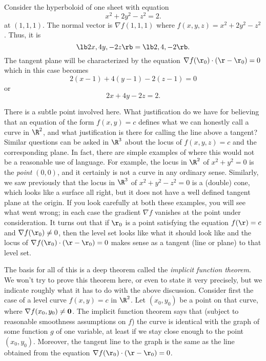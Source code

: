 \nextex
{}
Consider the hyperboloid of one sheet with equation
$$
  x^2 + 2y^2 - z^2 = 2.
$$
at $(1, 1, 1)$.  The normal vector is $\nabla f(1, 1, 1)$
where $f(x,y,z) = x^2 + 2y^2 - z^2$.  Thus, it is
$$
\lb 2x, 4y, -2z \rb = \lb 2, 4, -2 \rb.
$$
The tangent plane will be characterized by the equation
$\nabla f(\r_0)\cdot(\r - \r_0) = 0$ which in this case
becomes
$$
   2(x - 1) + 4(y - 1) - 2(z - 1) = 0
$$
or
$$
  2x + 4y - 2z = 2.
$$

\endexample

There is a subtle point involved here.  What justification do we
have for believing that an equation of the form
$f(x,y) = c$ defines what we can honestly call a curve
in $\R^2$, and what justification is there for calling the
line above a tangent?  Similar questions can be
asked in $\R^3$ about the
 locus of $f(x,y,z) = c$ and the corresponding plane.
In fact, there are simple examples of where this would not
be a reasonable use of language.  For example, the locus in $\R^2$
of $x^2 + y^2 = 0$ is the {\it point\/} $(0,0)$, and it
certainly is not a curve in any ordinary sense.  Similarly,
 we saw previously that the locus in
$\R^3$ of $x^2 + y^2 - z^2 = 0$ is a (double)
cone, which looks like a surface all right, but it does not have
a well defined tangent plane at the origin.
If you look carefully at both these examples, you will see what
went wrong; in each case the gradient $\nabla f$ vanishes at
the point under consideration.  It turns out that if $\r_0$
is a point satisfying the equation $f(\r) = c$ and $\nabla f(\r_0)
\not= 0$, then the level set looks like what it should look like
and the locus of $\nabla f(\r_0)\cdot (\r - \r_0) = 0$
makes sense as a tangent (line or plane) to that level set.
\medskip
\centerline{}
\medskip
The basis for all of this is a deep theorem called the
{\it implicit function theorem}.  We won't try to prove this
%
theorem here, or even to state it very precisely, but we
indicate roughly what it has to do with the above discussion.
Consider first the case of a level curve $f(x,y) = c$ in
$\R^2$.   Let $(x_0, y_0)$ be a point on that curve, where
$\nabla f(x_0, y_0) \ne \bold 0$.  The implicit function theorem
says that (subject to reasonable smoothness assumptions on $f$)
the curve is identical with the graph of some function $g$
of one variable, at least if we stay close enough to the point
$(x_0,y_0)$.  Moreover, the tangent line to the graph is the
same as the line obtained from the equation $\nabla f(\r_0)
\cdot (\r -\r_0) = 0$.   
\medskip
\centerline{}
\medskip

